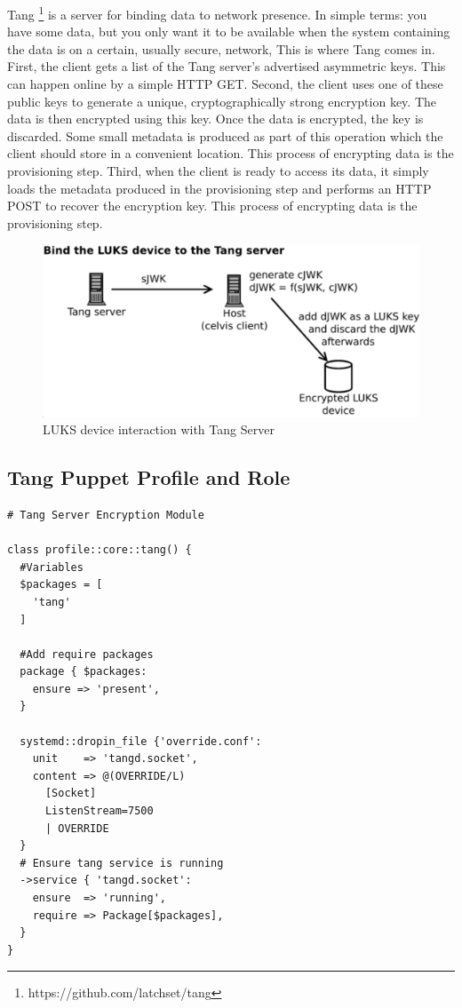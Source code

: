 Tang \footnote{https://github.com/latchset/tang} is a server for binding data to network presence. In simple terms: you have some data, but you only want it to be available when the system containing the data is on a certain, usually secure, network, This is where Tang comes in.
First, the client gets a list of the Tang server's advertised asymmetric keys. This can happen online by a simple HTTP GET.
Second, the client uses one of these public keys to generate a unique, cryptographically strong encryption key. The data is then encrypted using this key. Once the data is encrypted, the key is discarded. Some small metadata is produced as part of this operation which the client should store in a convenient location. This process of encrypting data is the provisioning step.
Third, when the client is ready to access its data, it simply loads the metadata produced in the provisioning step and performs an HTTP POST to recover the encryption key. This process of encrypting data is the provisioning step.

\vskip 2cm
\begin{figure}
  \includegraphics[width=14cm]{images/image3.png}
  \centering
  \caption{LUKS device interaction with Tang Server}
\end{figure}

\newpage
\subsection{Tang Puppet Profile and Role}

\begin{lstlisting}
# Tang Server Encryption Module

class profile::core::tang() {
  #Variables
  $packages = [
    'tang'
  ]

  #Add require packages
  package { $packages:
    ensure => 'present',
  }

  systemd::dropin_file {'override.conf':
    unit    => 'tangd.socket',
    content => @(OVERRIDE/L)
      [Socket]
      ListenStream=7500
      | OVERRIDE
  }
  # Ensure tang service is running
  ->service { 'tangd.socket':
    ensure  => 'running',
    require => Package[$packages],
  }
}
\end{lstlisting}

